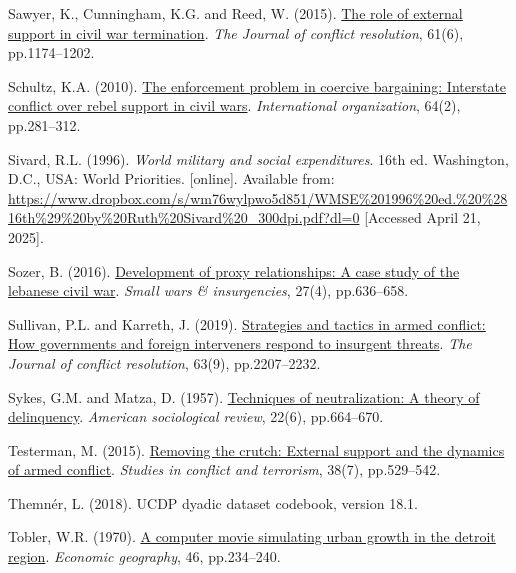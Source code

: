 \documentclass[
]{article}
\newlength{\cslhangindent}
\newenvironment{CSLReferences}[2] %
 {\begin{list}{}{%
  \setlength{\itemindent}{0pt}
  \setlength{\leftmargin}{0pt}
  \setlength{\parsep}{0pt}
  \ifodd #1
   \setlength{\leftmargin}{\cslhangindent}
   \setlength{\itemindent}{-1\cslhangindent}
  \fi
  \setlength{\itemsep}{#2\baselineskip}}}
 {\end{list}}
\begin{document}
\begin{CSLReferences}{0}{1}
Sawyer, K., Cunningham, K.G. and Reed, W. (2015).
\href{https://doi.org/10.1177/0022002715600761}{The role of external
support in civil war termination}. \emph{The Journal of conflict
resolution}, 61(6), pp.1174--1202.

Schultz, K.A. (2010).
\href{https://doi.org/10.1017/S0020818310000032}{The enforcement problem
in coercive bargaining: Interstate conflict over rebel support in civil
wars}. \emph{International organization}, 64(2), pp.281--312.

Sivard, R.L. (1996). \emph{World military and social expenditures}. 16th
ed. Washington, D.C., USA: World Priorities. {[}online{]}. Available
from:
\url{https://www.dropbox.com/s/wm76wylpwo5d851/WMSE\%201996\%20ed.\%20\%2816th\%29\%20by\%20Ruth\%20Sivard\%20_300dpi.pdf?dl=0}
{[}Accessed April 21, 2025{]}.

Sozer, B. (2016).
\href{https://doi.org/10.1080/09592318.2016.1189495}{Development of
proxy relationships: A case study of the lebanese civil war}.
\emph{Small wars \& insurgencies}, 27(4), pp.636--658.

Sullivan, P.L. and Karreth, J. (2019).
\href{https://doi.org/10.1177/0022002719828103}{Strategies and tactics
in armed conflict: How governments and foreign interveners respond to
insurgent threats}. \emph{The Journal of conflict resolution}, 63(9),
pp.2207--2232.

Sykes, G.M. and Matza, D. (1957).
\href{https://doi.org/10.2307/2089195}{Techniques of neutralization: A
theory of delinquency}. \emph{American sociological review}, 22(6),
pp.664--670.

Testerman, M. (2015).
\href{https://doi.org/10.1080/1057610X.2015.1016312}{Removing the
crutch: External support and the dynamics of armed conflict}.
\emph{Studies in conflict and terrorism}, 38(7), pp.529--542.

Themnér, L. (2018). UCDP dyadic dataset codebook, version 18.1.

Tobler, W.R. (1970). \href{https://doi.org/10.2307/143141}{A computer
movie simulating urban growth in the detroit region}. \emph{Economic
geography}, 46, pp.234--240.


\end{CSLReferences}
\end{document}
